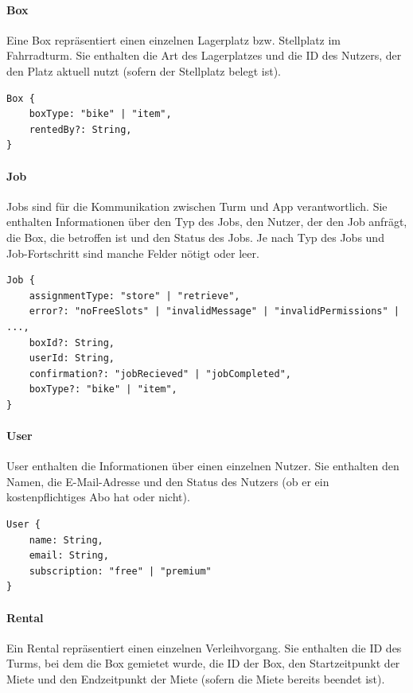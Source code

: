 \paragraph{Box}
Eine Box repräsentiert einen einzelnen Lagerplatz bzw. Stellplatz im Fahrradturm. Sie enthalten die Art des Lagerplatzes und die ID des Nutzers, der den Platz aktuell nutzt (sofern der Stellplatz belegt ist).

\begin{verbatim}
Box {
    boxType: "bike" | "item",
    rentedBy?: String,
}
\end{verbatim}


\paragraph{Job}
Jobs sind für die Kommunikation zwischen Turm und App verantwortlich. Sie enthalten Informationen über den Typ des Jobs, den Nutzer, der den Job anfrägt, die Box, die betroffen ist und den Status des Jobs. Je nach Typ des Jobs und Job-Fortschritt sind manche Felder nötigt oder leer.

\begin{verbatim}
Job {
    assignmentType: "store" | "retrieve",
    error?: "noFreeSlots" | "invalidMessage" | "invalidPermissions" | ...,
    boxId?: String,
    userId: String,
    confirmation?: "jobRecieved" | "jobCompleted",
    boxType?: "bike" | "item",
}
\end{verbatim}


\paragraph{User}
User enthalten die Informationen über einen einzelnen Nutzer. Sie enthalten den Namen, die E-Mail-Adresse und den Status des Nutzers (ob er ein kostenpflichtiges Abo hat oder nicht).

\begin{verbatim}
User {
    name: String,
    email: String,
    subscription: "free" | "premium"
}
\end{verbatim}


\paragraph{Rental}
Ein Rental repräsentiert einen einzelnen Verleihvorgang. Sie enthalten die ID des Turms, bei dem die Box gemietet wurde, die ID der Box, den Startzeitpunkt der Miete und den Endzeitpunkt der Miete (sofern die Miete bereits beendet ist).

